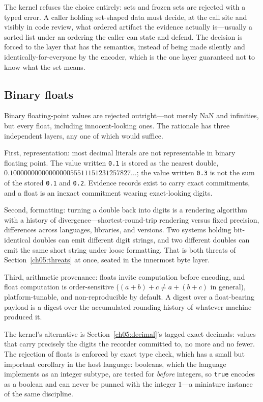 The kernel refuses the choice entirely: sets and frozen sets are rejected
with a typed error. A caller holding set-shaped data must decide, at the
call site and visibly in code review, what ordered artifact the evidence
actually is---usually a sorted list under an ordering the caller can state
and defend. The decision is forced to the layer that has the semantics,
instead of being made silently and identically-for-everyone by the encoder,
which is the one layer guaranteed not to know what the set means.

\subsection{Binary floats}\label{ch05:floats}

Binary floating-point values are rejected outright---not merely NaN and
infinities, but every float, including innocent-looking ones. The rationale
has three independent layers, any one of which would suffice.

First, representation: most decimal literals are not representable in
binary floating point. The value written \texttt{0.1} is stored as the
nearest double, $0.1000000000000000055511151231257827\ldots$; the value
written \texttt{0.3} is not the sum of the stored \texttt{0.1} and
\texttt{0.2}. Evidence records exist to carry exact commitments, and a float
is an inexact commitment wearing exact-looking digits.

Second, formatting: turning a double back into digits is a rendering
algorithm with a history of divergence---shortest-round-trip rendering
versus fixed precision, differences across languages, libraries, and
versions. Two systems holding bit-identical doubles can emit different
digit strings, and two different doubles can emit the same short string
under loose formatting. That is both threats of
Section~\ref{ch05:threats} at once, seated in the innermost byte layer.

Third, arithmetic provenance: floats invite computation before encoding,
and float computation is order-sensitive ($ (a+b)+c \neq a+(b+c) $ in
general), platform-tunable, and non-reproducible by default. A digest over
a float-bearing payload is a digest over the accumulated rounding history
of whatever machine produced it.

The kernel's alternative is Section~\ref{ch05:decimal}'s tagged exact
decimals: values that carry precisely the digits the recorder committed to,
no more and no fewer. The rejection of floats is enforced by exact type
check, which has a small but important corollary in the host language:
booleans, which the language implements as an integer subtype, are tested
for \emph{before} integers, so \texttt{true} encodes as a boolean and can
never be punned with the integer $1$---a miniature instance of the same
discipline.

